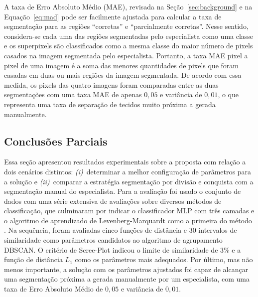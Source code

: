 A taxa de Erro Absoluto Médio (MAE), revisada na Seção~\ref{sec:background} e na Equação~\ref{eq:mad} pode ser facilmente ajustada para calcular a taxa de segmentação para as regiões ``corretas'' e ``parcialmente corretas''.
Nesse sentido, considera-se cada uma das regiões segmentadas pelo especialista como uma classe e os superpixels são classificados como a mesma classe do maior número de pixels casados na imagem segmentada pelo especialista.
Portanto, a taxa MAE pixel a pixel de uma imagem é a soma das menores quantidades de pixels que foram casadas em duas ou mais regiões da imagem segmentada.
De acordo com essa medida, os pixels das quatro imagens foram comparadas entre as duas segmentações com uma taxa MAE de apenas $0,05$ e variância de $0,01$, o que representa uma taxa de separação de tecidos muito próxima a gerada manualmente.

\subsection{Conclusões Parciais}

Essa seção apresentou resultados experimentais sobre a proposta \system com relação a dois cenários distintos: 
\textit{(i)}~determinar a melhor configuração de parâmetros para a solução e 
\textit{(ii)}~comparar a estratégia segmentação por divisão e conquista com a segmentação manual do especialista.
Para a avaliação foi usado o conjunto de dados \dataset com uma série extensiva de avaliações sobre diversos métodos de classificação, que culminaram por indicar o classificador MLP com três camadas e o algoritmo de aprendizado de Levenberg-Marquardt como a primeira do método \system.
Na sequência, foram avaliadas cinco funções de distância e $30$ intervalos de similaridade como parâmetros candidatos ao algoritmo de agrupamento DBSCAN.
O critério de Scree-Plot indicou o limite de similaridade de $3\%$ e a função de distância $L_1$ como os parâmetros mais adequados.
Por último, mas não menos importante, a solução \system com os parâmetros ajustados foi capaz de alcançar uma segmentação próxima a gerada manualmente por um especialista, com uma taxa de Erro Absoluto Médio de $0,05$ e variância de $0,01$.
\newpage
\thispagestyle{plain} %
\mbox{}


